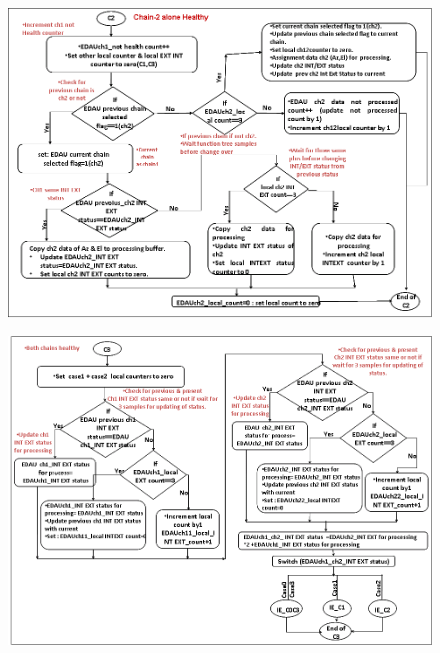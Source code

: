 \begin{figure}[H]
	\centering
	\includegraphics[width=\linewidth]{./FlowCharts/PngFlowCharts/EDAU7.png}
\end{figure}


\begin{figure}[H]
	\centering
	\includegraphics[width=\linewidth]{./FlowCharts/PngFlowCharts/EDAU8.png}
\end{figure}


